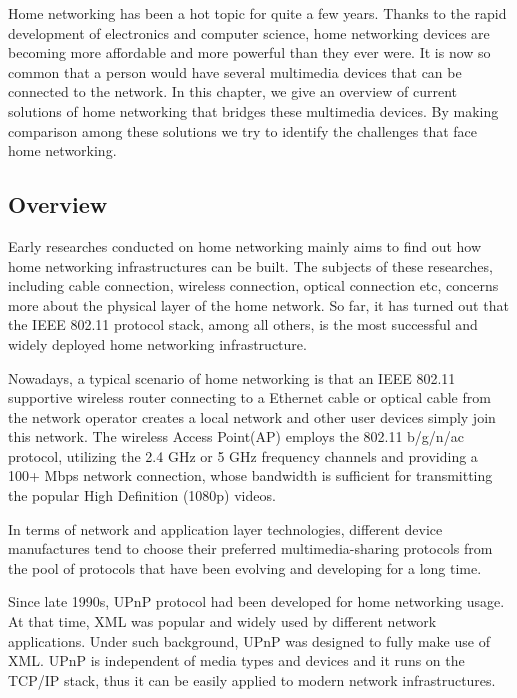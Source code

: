 
Home networking has been a hot topic for quite a few years. Thanks to the rapid development 
of electronics and computer science, home networking devices are becoming more affordable 
and more powerful than they ever were. It is now so common that a person would have several multimedia devices that can be connected to the network. In this chapter, we give an overview of current solutions of home networking that bridges these multimedia devices. By making comparison among these solutions we try to identify the challenges that face home networking. 

\subsection{Overview} 
Early researches \cite{link_layer_old} \cite{end_user} \cite{link_layer} 
 conducted on home networking mainly aims to find out how home 
 networking infrastructures can be built. The subjects of these researches, including cable connection, wireless connection, optical connection etc, concerns more about the physical layer of the home network.  So far, it has turned out that the IEEE 802.11 protocol stack, among all others, is the most successful and  widely deployed home networking infrastructure. 

Nowadays, a typical scenario of home networking is that an IEEE 802.11 supportive wireless router connecting to a Ethernet cable or optical cable from the network operator creates a local network and other user devices simply join this network. The wireless Access Point(AP) employs the 802.11 b/g/n/ac protocol, utilizing the 2.4 GHz or 5 GHz frequency channels and providing a 100+ Mbps  network connection, whose bandwidth is sufficient for transmitting the popular High Definition (1080p) videos. 

In terms of network and application layer technologies, different device 
manufactures tend to choose their preferred multimedia-sharing protocols from the pool of protocols that have been evolving and developing for a long time.

Since late 1990s, UPnP protocol had been developed for home networking usage. 
At that time, XML was popular and widely used by different network applications.
Under such background, UPnP was designed to fully make use of XML. UPnP is 
independent of media types and devices and it runs on the TCP/IP stack, thus it can 
be easily applied to modern network infrastructures. 

